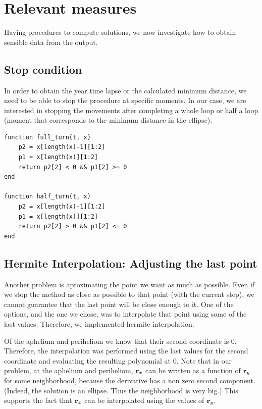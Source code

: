 \documentclass[12pt, onside]{article}
\newcommand{\vr}{{\vb{r}}}
\begin{document}
\section{Relevant measures}

    Having procedures to compute solutions,
we now investigate how to obtain sensible data from the output.

\subsection{Stop condition}

    In order to obtain the year time lapse or the calculated minimum distance,
we need to be able to stop the procedure at specific moments.
In our case, we are interested in stopping the movements after completing a whole loop
or half a loop (moment that corresponds to the minimum distance in the ellipse).

\begin{lstlisting}[caption=Stop conditions for the code]
function full_turn(t, x)
    p2 = x[length(x)-1][1:2]
    p1 = x[length(x)][1:2]
    return p2[2] < 0 && p1[2] >= 0
end

function half_turn(t, x)
    p2 = x[length(x)-1][1:2]
    p1 = x[length(x)][1:2]
    return p2[2] > 0 && p1[2] <= 0
end
\end{lstlisting}

\subsection{Hermite Interpolation: Adjusting the last point}

    Another problem is aproximating the point we want as much as possible.
Even if we stop the method as close as possible to that point (with the current step),
we cannot guarantee that the last point will be close enough to it.
One of the options, and the one we chose,
was to interpolate that point using some of the last values.
Therefore, we implemented hermite interpolation.

    Of the aphelium and periheliom we know that their second coordinate is $0$.
Therefore, the interpolation was performed
using the last values for the second coordinate and
evaluating the resulting polynomial at $0$.
Note that in our problem, at the aphelium and periheliom,
$\vr_x$ can be written as a function of $\vr_y$ for some neighborhood,
because the derivative has a non zero second component.
(Indeed, the solution is an ellipse. Thus the neighborhood is very big.)
This supports the fact that $\vr_x$ can be interpolated using the values of $\vr_y$.
\end{document}
